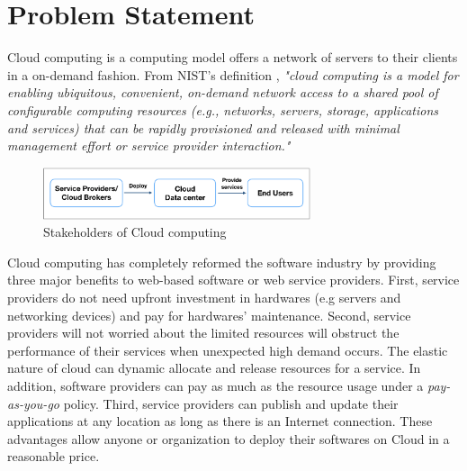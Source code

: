 \section{Problem Statement}


Cloud computing is a computing model offers a network of servers to their 
clients in a on-demand fashion. From NIST's definition \cite{Mell:2011jj}, \textit{"cloud computing is a model for enabling ubiquitous, convenient, on-demand network access to a shared pool of configurable computing resources (e.g., networks, servers, storage, applications and services) that can be rapidly provisioned and released with minimal management effort or service provider interaction."}

\begin{figure}
	\centering
	\includegraphics[width=0.7\textwidth]{pics/stakeholders.png}
	\caption{Stakeholders of Cloud computing}
	\label{fig:stakeholders}
\end{figure}

Cloud computing has completely reformed the software industry \cite{Buyya:2009ix} by providing three major benefits to web-based software or web service providers.
First, service providers do not need upfront investment in hardwares (e.g servers and networking devices) and pay for hardwares' maintenance. 
Second, service providers will not worried about the limited resources will obstruct the performance of their services when unexpected high demand occurs. The elastic nature of cloud can dynamic allocate and release resources for a service. In addition, software providers can pay as much as the resource usage under a \emph{pay-as-you-go} policy.
Third, service providers can publish and update their applications at any location 
as long as there is an Internet connection. 
These advantages allow anyone or organization to deploy their softwares on Cloud in
a reasonable price. 

